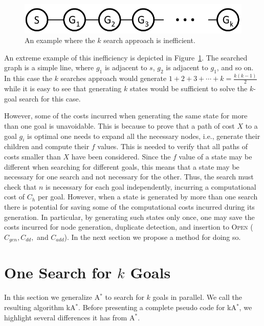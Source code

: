 \documentclass{aicom2e}
\newcommand{\kgs}{$k$-goal search}
\newcommand{\astar}{A$^*$}
\newcommand{\kastar}{kA$^*$}
\newcommand{\open}{\textsc{Open}}
\begin{document}
\begin{figure}
	\includegraphics[width=\columnwidth]{k-search-bad_cropped}
	\caption{An example where the $k$ search approach is inefficient.}
	\label{fig:k-search-bad}
\end{figure}
An extreme example of this inefficiency is depicted in Figure~\ref{fig:k-search-bad}. The searched graph is a simple line, 
where $g_1$ is adjacent to $s$, $g_2$ is adjacent to $g_1$, and so on. In this case the $k$ searches approach would generate
$1+2+3+\cdots+k=\frac{k(k-1)}{2}$ while it is easy to see that generating $k$ states would be sufficient to solve the \kgs{} for this case. 


However, some of the costs incurred when generating the same state for more than one goal is unavoidable. 
This is because to prove that a path of cost $X$ to a goal $g_i$ is optimal one needs to expand all the necessary nodes, 
i.e., generate their children and compute their $f$ values. This is needed to verify that all paths of costs smaller than $X$ have been considered. Since the $f$ value of a state may be different when searching for different goals, this means that a state may be necessary for one search and not necessary for the other. 
Thus, the search must check that $n$ is necessary for each goal independently, incurring a computational cost of $C_{h}$ per goal. 
However, when a state is generated by more than one search there is potential for saving some of the computational costs incurred during its generation. In particular, by generating such states only once, one may save the costs incurred for node generation, duplicate detection, and insertion to \open{} ($C_{gen}, C_{dd},$ and $C_{add}$). In the next section we propose a method for doing so. 



\section{One Search for $k$ Goals}
\label{sec:one-k-goal-search}
In this section we generalize \astar{} to search for $k$ goals in parallel. 
We call the resulting algorithm \kastar{}. 
Before presenting a complete pseudo code for \kastar{}, we highlight several differences it has from \astar{}. 
\end{document}
